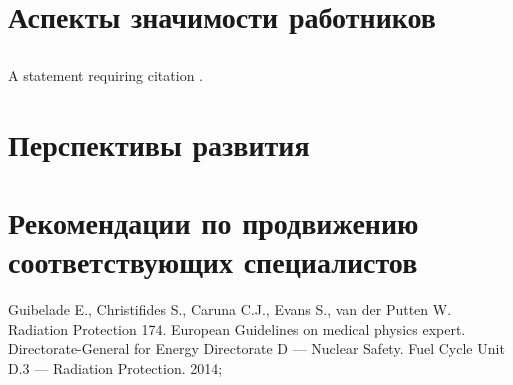 \documentclass[a4paper,10pt]{extarticle}
\begin{document}
\section{Аспекты значимости работников}

\subsection{}

A statement requiring citation \cite{No174}.

\subsection{}


\section{Перспективы развития}


\section{Рекомендации по продвижению соответствующих специалистов}

\begin{thebibliography}{99} %

Guibelade E., Christifides S., Caruna C.J., Evans S., van der Putten W.
\newblock Radiation Protection 174. European Guidelines on medical physics expert.  
\newblock Directorate-General for Energy Directorate D — Nuclear Safety. Fuel Cycle Unit D.3 — Radiation Protection.
2014;	%
\end{thebibliography}

\end{document}
